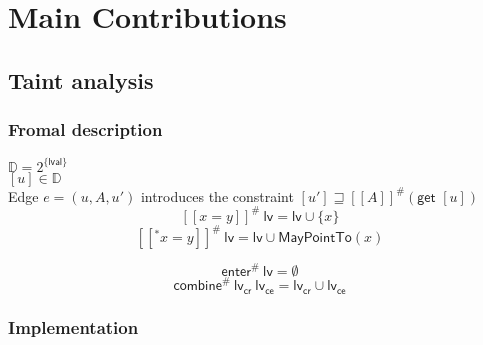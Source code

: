 
\chapter{Main Contributions}\label{chapter:mainContributions}

  \section{Taint analysis}
    
    \subsection{Fromal description}

    $\mathbb{D} = 2^{\{\textsf{lval}\}}$\\
    $[u] \in \mathbb{D}$\\
    Edge $e = (u, A, u')$ introduces the constraint $[u'] \sqsupseteq [\![  A ]\!] ^{\#}  (\textsf{get } [u]) $\\
    
    \[ [\![ x = y ]\!] ^{\#}\ \textsf{lv} =  \textsf{lv} \cup \{x\} \]
    \[ [\![ ^*x = y ]\!] ^{\#}\ \textsf{lv} =  \textsf{lv} \cup \textsf{MayPointTo}(x) \]
    
    \[ \textsf{enter}^{\#}\ \textsf{lv} = \emptyset\]
    \[ \textsf{combine}^{\#}\ \textsf{lv}_\textsf{cr}\ \textsf{lv}_\textsf{ce} = \textsf{lv}_\textsf{cr} \cup \textsf{lv}_\textsf{ce} \]


    \subsection{Implementation}

